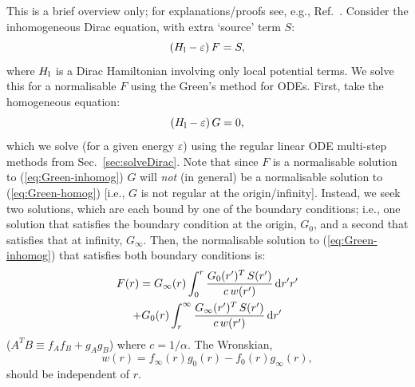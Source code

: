 \documentclass[10pt,twocolumn,a4paper]{article}%
\newcommand{\be}{\begin{equation}}
\newcommand{\ee}{\end{equation}}
\def\d{\ensuremath{{\rm d}}}
\def\en{\ensuremath{\varepsilon}}
\begin{document}
This is a brief overview only; for explanations/proofs see, e.g., Ref.~\cite{Arfken2013}.
Consider the inhomogeneous Dirac equation, with extra `source' term $S$:
\be\label{eq:Green-inhomog}
\left( H_{\rm l}- \en\right)F = S,
\ee
where $H_{\rm l}$ is a Dirac Hamiltonian involving only local potential terms.
We solve this for a normalisable $F$ using the Green's method for ODEs.
First, take the homogeneous equation:
\be\label{eq:Green-homog}
\left( H_{\rm l}- \en\right) G = 0,
\ee
which we solve (for a given energy $\en$) using the regular linear ODE multi-step methods from Sec.~\ref{sec:solveDirac}.
Note that since $F$ is a normalisable solution to (\ref{eq:Green-inhomog}) $G$ will {\em not} (in general) be a normalisable solution to (\ref{eq:Green-homog}) [i.e., $G$ is not regular at the origin/infinity].
Instead, we seek two solutions, which are each bound by one of the boundary conditions; i.e., one solution that satisfies the boundary condition at the origin, $G_0$, and a second that satisfies that at infinity, $G_\infty$.
Then, the normalisable solution to (\ref{eq:Green-inhomog}) that satisfies both boundary conditions is:
\begin{multline}\label{eq:GreensSolution}
F(r) = G_\infty(r) \int_0^r \frac{G_0(r')^T \, S(r')}{c\,w(r')}\,\d r'r'
\\
+  G_0(r) \int_r^\infty \frac{G_\infty(r')^T \, S(r')}{c\,w(r')}\,\d r'
\end{multline}
($A^T B \equiv f_A f_B + g_A g_B$)
where $c=1/\alpha$.
The Wronskian,
\be\label{eq:Green-Wronskian}
w(r) = f_\infty(r) g_0(r) - f_0(r)g_\infty(r),
\ee
should be independent of $r$.
\end{document}
